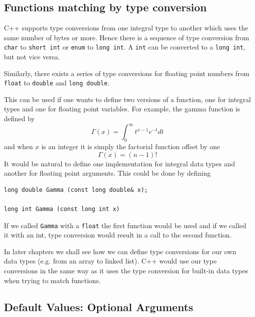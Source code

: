 
\subsection{Functions matching by type conversion}

C++ supports type conversions from one integral type to another which uses the
same number of bytes or more. Hence there is a sequence of type conversion
from \verb+char+ to \verb+short int+ or \verb+enum+ to \verb+long int+. A
\verb+int+ can be converted to a \verb+long int+, but not vice versa.

Similarly, there exists a series of type conversions for floating point numbers from
\verb+float+ to \verb+double+ and \verb+long double+.

This can be used if one wants to define two versions of a function, one for integral
types and one for floating point variables. For example, the gamma function is defined
by
\begin{equation}
  \Gamma(x) = \int_0^\infty t^{x-1}e^{-t} dt  \nonumber
\end{equation}
and when $x$ is an integer it is simply the factorial function offset by one
\begin{equation}
  \Gamma(x) = (n-1)! \nonumber
\end{equation}
It would be natural to define one implementation for integral data types and another
for floating point arguments. This could be done by defining
{\small \begin{verbatim}
long double Gamma (const long double& x);

long int Gamma (const long int x)
\end{verbatim}}
\noindent
If we called \verb+Gamma+ with a \verb+float+ the first function would be used and if we
called it with an int, type conversion would result in a call to the second function.

In later chapters we shall see how we can define type conversions for our own data types
(e.g. from an array to  linked list). C++ would use our type conversions in the same way
as it uses the type conversion for built-in data types when trying to match functions.


\subsection{Default Values: Optional Arguments}

